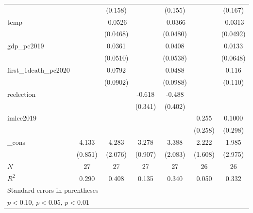 {\begin{tabular}{l*{6}{c}}
            &                     &     (0.158)         &                     &     (0.155)         &                     &     (0.167)         \\
[1em]
temp        &                     &     -0.0526         &                     &     -0.0366         &                     &     -0.0313         \\
            &                     &    (0.0468)         &                     &    (0.0480)         &                     &    (0.0492)         \\
[1em]
gdp\_pc2019  &                     &      0.0361         &                     &      0.0408         &                     &      0.0133         \\
            &                     &    (0.0510)         &                     &    (0.0538)         &                     &    (0.0648)         \\
[1em]
first\_1death\_pc2020&                     &      0.0792         &                     &      0.0488         &                     &       0.116         \\
            &                     &    (0.0902)         &                     &    (0.0988)         &                     &     (0.110)         \\
[1em]
reelection  &                     &                     &      -0.618\sym{*}  &      -0.488         &                     &                     \\
            &                     &                     &     (0.341)         &     (0.402)         &                     &                     \\
[1em]
imlee2019   &                     &                     &                     &                     &       0.255         &      0.1000         \\
            &                     &                     &                     &                     &     (0.258)         &     (0.298)         \\
[1em]
\_cons      &       4.133\sym{***}&       4.283\sym{*}  &       3.278\sym{***}&       3.388         &       2.222         &       1.985         \\
            &     (0.851)         &     (2.076)         &     (0.907)         &     (2.083)         &     (1.608)         &     (2.975)         \\
\hline
\(N\)       &          27         &          27         &          27         &          27         &          26         &          26         \\
\(R^{2}\)   &       0.290         &       0.408         &       0.135         &       0.340         &       0.050         &       0.332         \\
\hline\hline
\multicolumn{7}{l}{\footnotesize Standard errors in parentheses}\\
\multicolumn{7}{l}{\footnotesize \sym{*} \(p<0.10\), \sym{**} \(p<0.05\), \sym{***} \(p<0.01\)}\\
\end{tabular}
}
